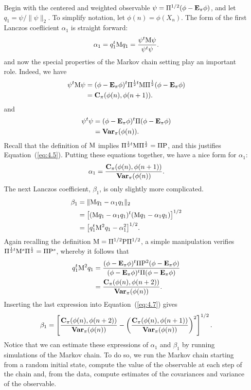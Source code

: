 Begin with the centered and weighted observable 
$\psi = \Pi^{1/2} (\phi - \mathbf{E}_\pi\phi)$,
and let $q_1 = \psi/\|\psi\|_2$.
To simplify notation, let $\phi(n) = \phi(X_n)$. 
The form of the first Lanczos coeﬂicient $\alpha_1$ is straight
forward:
\[
\alpha_1 = q_1^t \mathrm{M} q_1  = \frac{\psi^t\mathrm{M}\psi}{\psi^t\psi}.
\]
and now the special properties of the Markov chain setting play an important
role. Indeed, we have
\begin{align}
\label{eq:4.5}
\psi^t\mathrm{M}\psi &= (\phi - \mathbf{E}_\pi\phi)^t\Pi^{\frac{1}{2}t}\mathrm{M}\Pi^{\frac{1}{2}}(\phi- \mathbf{E}_\pi \phi)\nonumber\\
&= \mathbf{C}_\pi (\phi(n), \phi(n + 1)).
\end{align}
and
\begin{align}
\label{eq:4.6}
\psi^t\psi &= (\phi - \mathbf{E}_\pi\phi)^t\Pi(\phi- \mathbf{E}_\pi \phi)\nonumber\\
&= \mathbf{Var}_\pi(\phi(n)).
\end{align}
Recall that the definition of $\mathrm{M}$ implies 
$\Pi^{\frac{1}{2}t}\mathrm{M}\Pi^{\frac{1}{2}}= \Pi \mathrm{P}$, and this justifies 
Equation~(\ref{eq:4.5}). Putting
%
%
%
%
these equations together, we have a nice form for $\alpha_1$:
\[
\alpha_1= \frac{\mathbf{C}_\pi (\phi(n), \phi(n + 1))}{\mathbf{Var}_\pi(\phi(n))}.
\]
The next Lanczos coefficient, $\beta_1$, is only slightly more complicated.
\begin{align}
\label{eq:4.7}
\beta_1 &= \|\mathrm{M} q_1 - \alpha_1 q_1\|_2 \nonumber\\
&= \bigl[(\mathrm{M} q_1 - \alpha_1 q_1)^t(\mathrm{M} q_1 - \alpha_1 q_1)\bigr]^{1/2}\nonumber\\
&= \bigl[q_1^t\mathrm{M}^2 q_1 - \alpha^2_1\bigr]^{1/2}.
\end{align}
Again recalling the definition $\mathrm{M} =\Pi^{1/2}\mathrm{P}\Pi^{1/2}$, a simple manipulation verifies
$\Pi^{\frac{1}{2}t}\mathrm{M}^s\Pi^{\frac{1}{2}} = \Pi \mathrm{P}^s$,
whereby it follows that
\begin{align*}
q_1^t\mathrm{M}^2 q_1  &= \frac{(\phi - \mathbf{E}_\pi\phi)^t\Pi \mathrm{P}^2(\phi- \mathbf{E}_\pi \phi)}
{(\phi - \mathbf{E}_\pi\phi)^t\Pi (\phi- \mathbf{E}_\pi \phi)} \\
&= \frac{\mathbf{C}_\pi (\phi(n), \phi(n + 2))}{\mathbf{Var}_\pi(\phi(n))}.
\end{align*}
Inserting the last expression into Equation~(\ref{eq:4.7}) gives
\[
\beta_1 = \left[\frac{\mathbf{C}_\pi (\phi(n), \phi(n + 2))}{\mathbf{Var}_\pi(\phi(n))}
-\left( \frac{\mathbf{C}_\pi (\phi(n), \phi(n + 1))}{\mathbf{Var}_\pi(\phi(n))}\right)^2
\right]^{1/2}.
\]
Notice that we can estimate these expressions of $\alpha_1$ and $\beta_1$ by
running simulations of the Markov chain. 
To do so, we run the Markov chain starting from a random initial state, compute the value of
the observable at each step of the chain and, from the data, compute estimates of the covariances
and variance of the observable.

